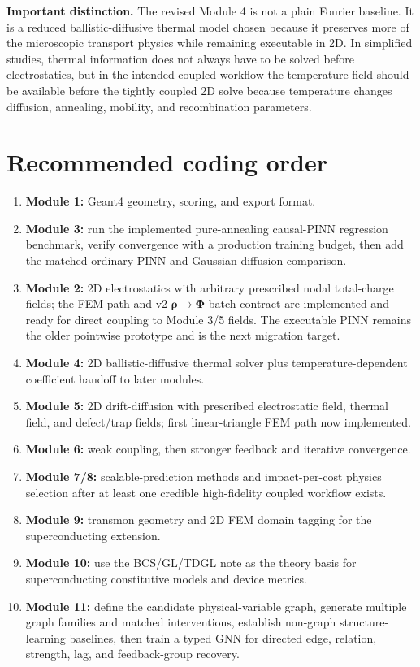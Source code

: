 \documentclass[11pt]{article}
\begin{document}
\begin{notebox}
\textbf{Important distinction.} The revised Module 4 is not a plain Fourier baseline. It is a reduced ballistic-diffusive thermal model chosen because it preserves more of the microscopic transport physics while remaining executable in 2D. In simplified studies, thermal information does not always have to be solved before electrostatics, but in the intended coupled workflow the temperature field should be available before the tightly coupled 2D solve because temperature changes diffusion, annealing, mobility, and recombination parameters.
\end{notebox}

\section{Recommended coding order}
\begin{enumerate}[leftmargin=1.6em]
    \item \textbf{Module 1:} Geant4 geometry, scoring, and export format.
    \item \textbf{Module 3:} run the implemented pure-annealing causal-PINN regression benchmark, verify convergence with a production training budget, then add the matched ordinary-PINN and Gaussian-diffusion comparison.
    \item \textbf{Module 2:} 2D electrostatics with arbitrary prescribed nodal total-charge fields; the FEM path and v2 $\bm{\rho}\rightarrow\bm{\Phi}$ batch contract are implemented and ready for direct coupling to Module 3/5 fields. The executable PINN remains the older pointwise prototype and is the next migration target.
    \item \textbf{Module 4:} 2D ballistic-diffusive thermal solver plus temperature-dependent coefficient handoff to later modules.
    \item \textbf{Module 5:} 2D drift-diffusion with prescribed electrostatic field, thermal field, and defect/trap fields; first linear-triangle FEM path now implemented.
    \item \textbf{Module 6:} weak coupling, then stronger feedback and iterative convergence.
    \item \textbf{Module 7/8:} scalable-prediction methods and impact-per-cost physics selection after at least one credible high-fidelity coupled workflow exists.
    \item \textbf{Module 9:} transmon geometry and 2D FEM domain tagging for the superconducting extension.
    \item \textbf{Module 10:} use the BCS/GL/TDGL note as the theory basis for superconducting constitutive models and device metrics.
    \item \textbf{Module 11:} define the candidate physical-variable graph, generate multiple graph families and matched interventions, establish non-graph structure-learning baselines, then train a typed GNN for directed edge, relation, strength, lag, and feedback-group recovery.
\end{enumerate}
\end{document}
